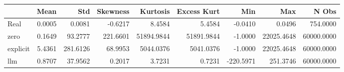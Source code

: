 \begin{tabular}{lrrrrrrrr}
\toprule
 & Mean & Std & Skewness & Kurtosis & Excess Kurt & Min & Max & N Obs \\
\midrule
Real & 0.0005 & 0.0081 & -0.6217 & 8.4584 & 5.4584 & -0.0410 & 0.0496 & 754.0000 \\
zero & 0.1649 & 93.2777 & 221.6601 & 51894.9844 & 51891.9844 & -1.0000 & 22025.4648 & 60000.0000 \\
explicit & 5.4361 & 281.6126 & 68.9953 & 5044.0376 & 5041.0376 & -1.0000 & 22025.4648 & 60000.0000 \\
llm & 0.8707 & 37.9562 & 0.2017 & 3.7231 & 0.7231 & -220.5971 & 251.3746 & 60000.0000 \\
\bottomrule
\end{tabular}
